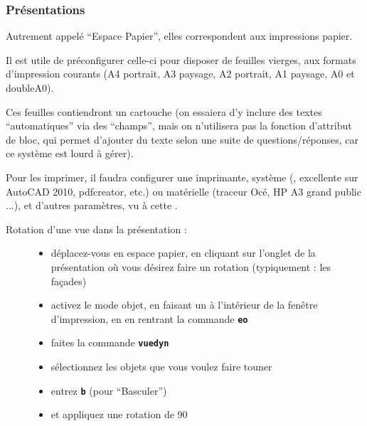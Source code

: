 \documentclass[a4paper,12pt,french]{sphinxmanual}
\begin{document}
\subsubsection{Présentations}
\label{acad/config_acad:presentations}
Autrement appelé ``Espace Papier'', elles correspondent aux impressions papier.

Il est utile de préconfigurer celle-ci pour disposer de feuilles vierges, aux formats d'impression courants (A4 portrait, A3 paysage, A2 portrait, A1 paysage, A0 et doubleA0).

Ces feuilles contiendront un cartouche (on essaiera d'y inclure des textes ``automatiques'' via des ``champs'', mais on n'utilisera pas la fonction d'attribut de bloc, qui permet d'ajouter du texte selon une suite de questions/réponses, car ce système est lourd à gérer).

Pour les imprimer, il faudra configurer une imprimante, système (, excellente sur AutoCAD 2010, pdfcreator, etc.) ou matérielle (traceur Océ, HP A3 grand public ...), et d'autres paramètres, vu à cette {\hyperref[acad/config_acad:mise\string-en\string-page]{}}.
\begin{description}
\item[{Rotation d'une vue dans la présentation :}] \leavevmode\begin{itemize}
\item {} 
déplacez-vous en espace papier, en cliquant sur l'onglet de la présentation où vous désirez faire un rotation (typiquement : les façades)

\item {} 
activez le mode objet, en faisant un  à l'intérieur de la fenêtre d'impression, en en rentrant la commande \textbf{\texttt{eo}}

\item {} 
faites la commande \textbf{\texttt{vuedyn}}

\item {} 
sélectionnez les objets que vous voulez faire touner

\item {} 
entrez \textbf{\texttt{b}} (pour ``Basculer'')

\item {} 
et appliquez une rotation de 90

\end{itemize}

\end{description}
\end{document}
